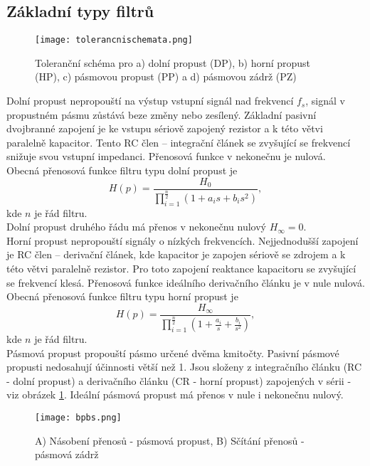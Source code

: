\subsection{Základní typy filtrů}
\begin{figure}[h]
\centering
\texttt{[image: tolerancnischemata.png]}
\caption[Toleranční schéma dolní propusti (DP), horní propusti (HP), pásmové propusti (PP) a pásmové zádrže]{Toleranční schéma pro a) dolní propust (DP), b) horní propust (HP), c) pásmovou propust (PP) a d) pásmovou zádrž (PZ)\cite{7}}
\end{figure}
\noindent Dolní propust nepropouští na výstup vstupní signál nad frekvencí $f_s$, signál v propustném pásmu zůstává beze změny nebo zesílený. Základní pasivní dvojbranné zapojení je ke vstupu sériově zapojený rezistor a k této větvi paralelně kapacitor. Tento RC člen -- integrační článek se zvyšující se frekvencí snižuje svou vstupní impedanci. Přenosová funkce v nekonečnu je nulová. \\
Obecná přenosová funkce filtru typu dolní propust je
\begin{equation}
H(p) = \frac{H_0}{\prod_{i=1}^{\frac{n}{2}} (1 + a_i s + b_i s^2)} \label{r:FTR},
\end{equation}
kde $n$ je řád filtru.\\
Dolní propust druhého řádu má přenos v nekonečnu nulový $H_{\infty} = 0$. \\
Horní propust nepropouští signály o nízkých frekvencích. Nejjednodušší zapojení je RC člen -- derivační článek, kde kapacitor je zapojen sériově se zdrojem a k této větvi paralelně rezistor. Pro toto zapojení reaktance kapacitoru se zvyšující se frekvencí klesá. Přenosová funkce ideálního derivačního článku je v nule nulová. \\
Obecná přenosová funkce filtru typu horní propust je
\begin{equation}
H(p) = \frac{H_{\infty}}{\prod_{i=1}^{\frac{n}{2}} (1 + \frac{a_i}{s} + \frac{b_i}{s^2})} \label{r:FTR2},
\end{equation}
kde $n$ je řád filtru.\\
Pásmová propust propouští pásmo určené dvěma kmitočty. Pasivní pásmové propusti nedosahují účinnosti větší než 1. Jsou složeny z integračního článku (RC - dolní propust) a derivačního článku (CR - horní propust) zapojených v sérii - viz obrázek \ref{s:BPBS}. Ideální pásmová propust má přenos v nule i nekonečnu nulový. \\
\begin{figure}[h]
\centering
\texttt{[image: bpbs.png]}
\caption[A) Násobení přenosů - pásmová propust, B) Sčítání přenosů - pásmová zádrž]{A) Násobení přenosů - pásmová propust, B) Sčítání přenosů - pásmová zádrž \cite{8} \label{s:BPBS}}
\end{figure}
